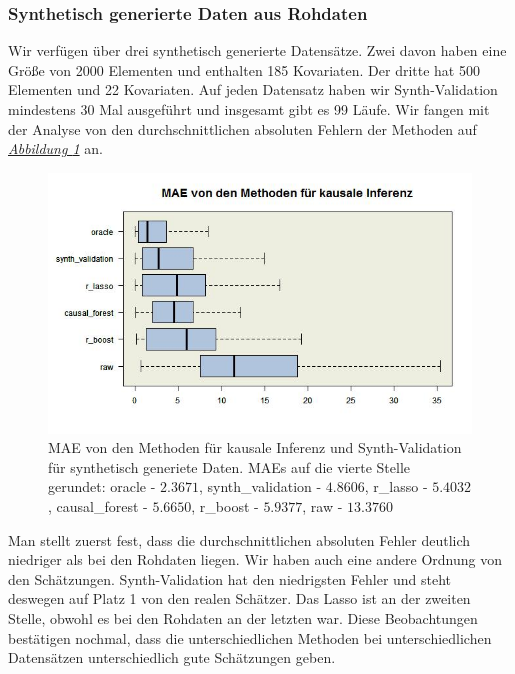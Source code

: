 \documentclass[12pt,a4paper,twoside]{scrartcl}
\numberwithin{equation}{section}
\newcommand{\reffig}[1]{\emph{\hyperref[#1]{Abbildung \ref*{#1}}}}
\begin{document}
\subsubsection{Synthetisch generierte Daten aus Rohdaten}\label{subsubsec:ergebnisseSynthetischGeneriertenDaten}
Wir verfügen über drei synthetisch generierte Datensätze. Zwei davon haben eine Größe von 2000 Elementen und enthalten 185 Kovariaten. Der dritte hat 500 Elementen und 22 Kovariaten. Auf jeden Datensatz haben wir Synth-Validation mindestens 30 Mal ausgeführt und insgesamt gibt es 99 Läufe. Wir fangen mit der Analyse von den durchschnittlichen absoluten Fehlern der Methoden auf \reffig{fig:generatedDataBoxplot} an.\par

\begin{center}
\begin{figure}[h]
    \centering
    \includegraphics[height=0.5\textwidth, width=1\textwidth]{figures/plots/generatedDataBoxplot.jpeg}
    \caption[MAE von den Methoden für kausale Inferenz und Synth-Validation für synthetisch generiete Daten]{MAE von den Methoden für kausale Inferenz und Synth-Validation für synthetisch generiete Daten. MAEs auf die vierte Stelle gerundet: oracle - $2.3671$, synth\_validation - $4.8606$, r\_lasso - $5.4032$, causal\_forest - $5.6650$, r\_boost - $5.9377$, raw - $13.3760$}\label{fig:generatedDataBoxplot}
  \end{figure}
\end{center}

\noindent
Man stellt zuerst fest, dass die durchschnittlichen absoluten Fehler deutlich niedriger als bei den Rohdaten liegen. Wir haben auch eine andere Ordnung von den Schätzungen. Synth-Validation hat den niedrigsten Fehler und steht deswegen auf Platz 1 von den realen Schätzer. Das Lasso ist an der zweiten Stelle, obwohl es bei den Rohdaten an der letzten war. Diese Beobachtungen bestätigen nochmal, dass die unterschiedlichen Methoden bei unterschiedlichen Datensätzen unterschiedlich gute Schätzungen geben.\par
\end{document}
